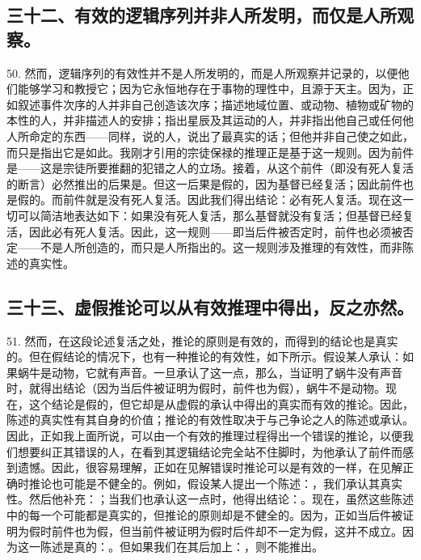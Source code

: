 
\subsection{三十二、有效的逻辑序列并非人所发明，而仅是人所观察。}

50. 然而，逻辑序列的有效性并不是人所发明的，而是人所观察并记录的，以便他们能够学习和教授它；因为它永恒地存在于事物的理性中，且源于天主。因为，正如叙述事件次序的人并非自己创造该次序；描述地域位置、或动物、植物或矿物的本性的人，并非描述人的安排；指出星辰及其运动的人，并非指出他自己或任何他人所命定的东西——同样，说的人，说出了最真实的话；但他并非自己使之如此，而只是指出它是如此。我刚才引用的宗徒保禄的推理正是基于这一规则。因为前件是——这是宗徒所要推翻的犯错之人的立场。接着，从这个前件（即没有死人复活的断言）必然推出的后果是。但这一后果是假的，因为基督已经复活；因此前件也是假的。而前件就是没有死人复活。因此我们得出结论：必有死人复活。现在这一切可以简洁地表达如下：如果没有死人复活，那么基督就没有复活；但基督已经复活，因此必有死人复活。因此，这一规则——即当后件被否定时，前件也必须被否定——不是人所创造的，而只是人所指出的。这一规则涉及推理的有效性，而非陈述的真实性。\par


\subsection{三十三、虚假推论可以从有效推理中得出，反之亦然。}

51. 然而，在这段论述复活之处，推论的原则是有效的，而得到的结论也是真实的。但在假结论的情况下，也有一种推论的有效性，如下所示。假设某人承认：如果蜗牛是动物，它就有声音。一旦承认了这一点，那么，当证明了蜗牛没有声音时，就得出结论（因为当后件被证明为假时，前件也为假），蜗牛不是动物。现在，这个结论是假的，但它却是从虚假的承认中得出的真实而有效的推论。因此，陈述的真实性有其自身的价值；推论的有效性取决于与己争论之人的陈述或承认。因此，正如我上面所说，可以由一个有效的推理过程得出一个错误的推论，以便我们想要纠正其错误的人，在看到其逻辑结论完全站不住脚时，为他承认了前件而感到遗憾。因此，很容易理解，正如在见解错误时推论可以是有效的一样，在见解正确时推论也可能是不健全的。例如，假设某人提出一个陈述：，我们承认其真实性。然后他补充：；当我们也承认这一点时，他得出结论：。现在，虽然这些陈述中的每一个可能都是真实的，但推论的原则却是不健全的。因为，正如当后件被证明为假时前件也为假，但当前件被证明为假时后件却不一定为假，这并不成立。因为这一陈述是真的：。但如果我们在其后加上：，则不能推出。\par

